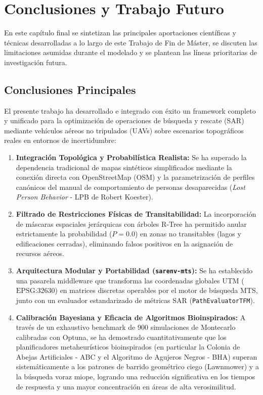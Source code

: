 \chapter{Conclusiones y Trabajo Futuro}
\label{cap:conclusiones}

En este capítulo final se sintetizan las principales aportaciones científicas y técnicas desarrolladas a lo largo de este Trabajo de Fin de Máster, se discuten las limitaciones asumidas durante el modelado y se plantean las líneas prioritarias de investigación futura.

\section{Conclusiones Principales}

El presente trabajo ha desarrollado e integrado con éxito un framework completo y unificado para la optimización de operaciones de búsqueda y rescate (SAR) mediante vehículos aéreos no tripulados (UAVs) sobre escenarios topográficos reales en entornos de incertidumbre:

\begin{enumerate}
    \item \textbf{Integración Topológica y Probabilística Realista:} Se ha superado la dependencia tradicional de mapas sintéticos simplificados mediante la conexión directa con OpenStreetMap (OSM) y la parametrización de perfiles canónicos del manual de comportamiento de personas desaparecidas (\textit{Lost Person Behavior} - LPB de Robert Koester).
    \item \textbf{Filtrado de Restricciones Físicas de Transitabilidad:} La incorporación de máscaras espaciales jerárquicas con árboles R-Tree ha permitido anular estrictamente la probabilidad ($P=0.0$) en zonas no transitables (lagos y edificaciones cerradas), eliminando falsos positivos en la asignación de recursos aéreos.
    \item \textbf{Arquitectura Modular y Portabilidad (\texttt{sarenv-mts}):} Se ha establecido una pasarela middleware que transforma las coordenadas globales UTM ($\text{EPSG:32630}$) en matrices discretas operables por el motor de búsqueda MTS, junto con un evaluador estandarizado de métricas SAR (\texttt{PathEvaluatorTFM}).
    \item \textbf{Calibración Bayesiana y Eficacia de Algoritmos Bioinspirados:} A través de un exhaustivo benchmark de 900 simulaciones de Montecarlo calibradas con Optuna, se ha demostrado cuantitativamente que los planificadores metaheurísticos bioinspirados (en particular la Colonia de Abejas Artificiales - ABC y el Algoritmo de Agujeros Negros - BHA) superan sistemáticamente a los patrones de barrido geométrico ciego (Lawnmower) y a la búsqueda voraz miope, logrando una reducción significativa en los tiempos de respuesta y una mayor concentración en áreas de alta verosimilitud.
\end{enumerate}

